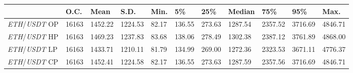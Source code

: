 \begin{tabular}{lllllllllll}
\toprule
 & \textbf{O.C.} & \textbf{Mean} & \textbf{S.D.} & \textbf{Min.} & \textbf{5\%} & \textbf{25\%} & \textbf{Median} & \textbf{75\%} & \textbf{95\%} & \textbf{Max.} \\
\midrule
\emph{ETH}/\emph{USDT} OP & 16163 & 1452.22 & 1224.53 & 82.17 & 136.55 & 273.63 & 1287.54 & 2357.52 & 3716.69 & 4846.71 \\
\emph{ETH}/\emph{USDT} HP & 16163 & 1469.23 & 1237.83 & 83.68 & 138.06 & 278.49 & 1302.38 & 2387.12 & 3761.89 & 4868.00 \\
\emph{ETH}/\emph{USDT} LP & 16163 & 1433.71 & 1210.11 & 81.79 & 134.99 & 269.00 & 1272.36 & 2323.53 & 3671.11 & 4776.37 \\
\emph{ETH}/\emph{USDT} CP & 16163 & 1452.41 & 1224.58 & 82.17 & 136.55 & 273.63 & 1287.59 & 2357.56 & 3716.69 & 4846.71 \\
\bottomrule
\end{tabular}
